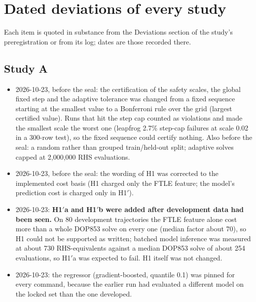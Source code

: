 \documentclass[10pt,letterpaper]{article}
\begin{document}
\section{Dated deviations of every study}
\label{sec:dev}
Each item is quoted in substance from the Deviations section of the study's preregistration or from its log; dates are those recorded there.

\subsection{Study A}
\begin{itemize}
\item 2026-10-23, before the seal: the certification of the safety scales, the global fixed step and the adaptive tolerance was changed from a
fixed sequence starting at the smallest value to a Bonferroni rule over the grid (largest certified value). Runs that hit the step cap counted as
violations and made the smallest scale the worst one (leapfrog 2.7\% step-cap failures at scale 0.02 in a 300-row test), so the fixed sequence
could certify nothing. Also before the seal: a random rather than grouped train/held-out split; adaptive solves capped at 2,000,000 RHS
evaluations.
\item 2026-10-23, before the seal: the wording of H1 was corrected to the implemented cost basis (H1 charged only the FTLE feature; the model's
prediction cost is charged only in H1$'$).
\item 2026-10-23: \textbf{H1$'$a and H1$'$b were added after development data had been seen.} On 80 development trajectories the FTLE feature
alone cost more than a whole DOP853 solve on every one (median factor about 70), so H1 could not be supported as written; batched model inference
was measured at about 730 RHS-equivalents against a median DOP853 solve of about 254 evaluations, so H1$'$a was expected to fail. H1 itself was not
changed.
\item 2026-10-23: the regressor (gradient-boosted, quantile 0.1) was pinned for every command, because the earlier run had evaluated a different
model on the locked set than the one developed.
\end{itemize}
\end{document}
